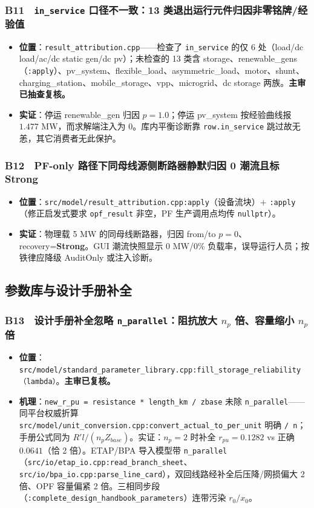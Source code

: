 \documentclass[11pt,a4paper,fontset=fandol]{ctexart}
\newcommand{\file}[1]{\texttt{#1}}
\begin{document}
\subsubsection*{B11　\texttt{in\_service} 口径不一致：13 类退出运行元件归因非零铭牌/经验值}
\begin{itemize}
  \item \textbf{位置}：\file{result\_attribution.cpp}——检查了 \texttt{in\_service} 的仅 6 处（load/dc load/ac/dc static gen/dc pv）；未检查的 13 类含 storage、renewable\_gens（\file{:apply}）、pv\_system、flexible\_load、asymmetric\_load、motor、shunt、charging\_station、mobile\_storage、vpp、microgrid、dc storage 两族。\textbf{主审已抽查复核。}
  \item \textbf{实证}：停运 renewable\_gen 归因 $p=1.0$；停运 pv\_system 按经验曲线报 $1.477$ MW，而求解端注入为 0。库内平衡诊断靠 \texttt{row.in\_service} 跳过故无恙，其它消费者无此保护。
\end{itemize}

\subsubsection*{B12　PF-only 路径下同母线源侧断路器静默归因 0 潮流且标 Strong}
\begin{itemize}
  \item \textbf{位置}：\file{src/model/result\_attribution.cpp:apply}（设备流块）$+$ \file{:apply}（修正启发式要求 \texttt{opf\_result} 非空，PF 生产调用点均传 \texttt{nullptr}）。
  \item \textbf{实证}：物理载 5 MW 的同母线断路器，归因 from/to $p=0$、recovery=\textbf{Strong}。GUI 潮流快照显示 0 MW/0\% 负载率，误导运行人员；按铁律应降级 AuditOnly 或注入诊断。
\end{itemize}

\subsection{参数库与设计手册补全}

\subsubsection*{B13　设计手册补全忽略 \texttt{n\_parallel}：阻抗放大 $n_p$ 倍、容量缩小 $n_p$ 倍}
\begin{itemize}
  \item \textbf{位置}：\file{src/model/standard\_parameter\_library.cpp:fill\_storage\_reliability（lambda）}。\textbf{主审已复核。}
  \item \textbf{机理}：\texttt{new\_r\_pu = resistance * length\_km / zbase} 未除 \texttt{n\_parallel}——同平台权威折算 \file{src/model/unit\_conversion.cpp:convert\_actual\_to\_per\_unit} 明确 \texttt{/ n}；手册公式同为 $R'l/(n_p Z_{base})$。实证：$n_p=2$ 时补全 $r_{pu}=0.1282$ vs 正确 $0.0641$（恰 2 倍）。ETAP/BPA 导入模型带 \texttt{n\_parallel}（\file{src/io/etap\_io.cpp:read\_branch\_sheet}、\file{src/io/bpa\_io.cpp:parse\_line\_card}），双回线路经补全后压降/网损偏大 2 倍、OPF 容量偏紧 2 倍。三相同步段（\file{:complete\_design\_handbook\_parameters}）连带污染 $r_0/x_0$。
\end{itemize}
\end{document}
